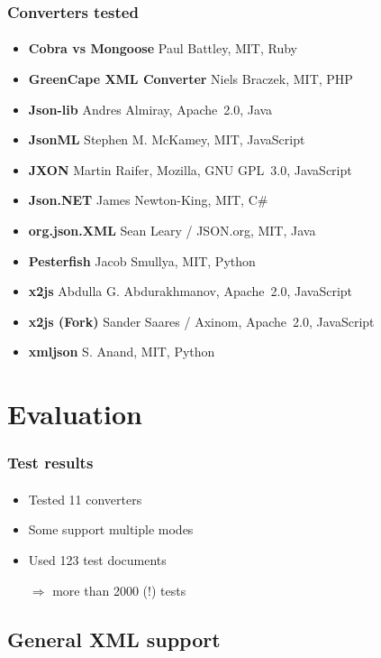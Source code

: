 \documentclass[
    alternativetitlepage=alternativ,
    cornerlogo=hgi_nds_logo2,
    sectionoverview,
]{rubpresentation}
\begin{document}
\begin{frame}
  \frametitle{Converters tested}
  \framesubtitle{}
  \begin{itemize}
    \item{} \textbf{Cobra vs Mongoose} Paul Battley, MIT, Ruby
    \item{} \textbf{GreenCape XML Converter} Niels Braczek, MIT, PHP
    \item{} \textbf{Json-lib} Andres Almiray, Apache~2.0, Java
    \item{} \textbf{JsonML} Stephen M. McKamey, MIT, JavaScript
    \item{} \textbf{JXON} Martin Raifer, Mozilla, GNU GPL~3.0, JavaScript
    \item{} \textbf{Json.NET} James Newton-King, MIT, C\#
    \item{} \textbf{org.json.XML} Sean Leary / JSON.org, MIT, Java
    \item{} \textbf{Pesterfish} Jacob Smullya, MIT, Python
    \item{} \textbf{x2js} Abdulla G. Abdurakhmanov, Apache~2.0, JavaScript
    \item{} \textbf{x2js (Fork)} Sander Saares / Axinom, Apache~2.0, JavaScript
    \item{} \textbf{xmljson} S. Anand, MIT, Python
  \end{itemize}
\end{frame}

\section{Evaluation}

\begin{frame}
  \frametitle{Test results}
  \framesubtitle{}
  \begin{itemize}
    \item{} Tested 11 converters
    \item{} Some support multiple modes
    \item{} Used 123 test documents
    \item[$\Rightarrow$]{} more than 2000 (!) tests
  \end{itemize}
\end{frame}

\subsection{General XML support}

\begingroup
  \begin{frame}[fragile]
    \vspace{-1.15cm}
    \begin{center}
      
    \end{center}
  \end{frame}
\endgroup
\end{document}
